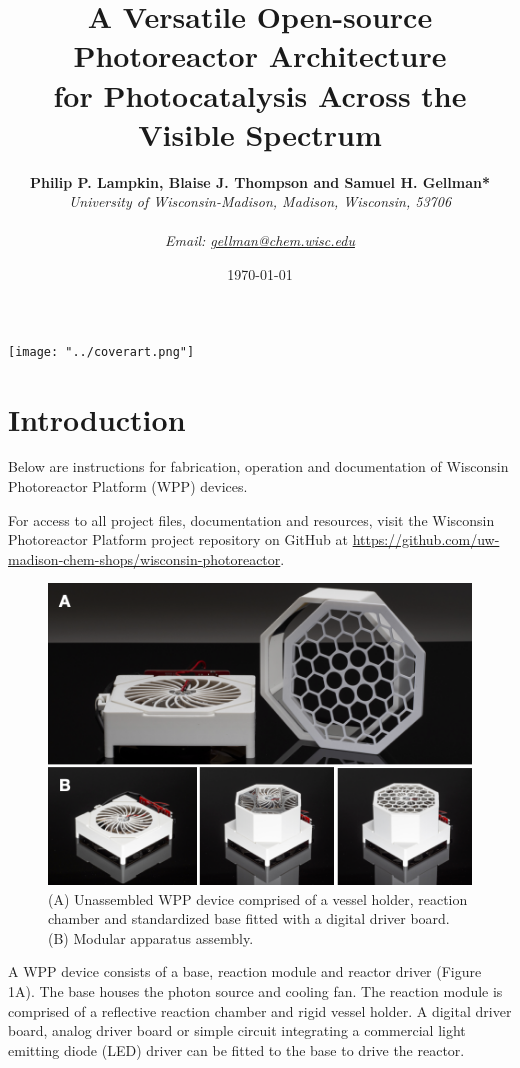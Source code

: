 \documentclass[11pt]{article}
\title{%
	\textbf{A Versatile Open-source Photoreactor Architecture\\ for Photocatalysis Across the Visible Spectrum}}
\author{\textbf{Philip P. Lampkin, Blaise J. Thompson and Samuel H. Gellman*} \\ \textit{University of Wisconsin-Madison, Madison, Wisconsin, 53706} \\ \\ \textit{Email: \href{mailto:gellman@chem.wisc.edu}{gellman@chem.wisc.edu}}}
\date{\today}
\let\stdsection\section
\renewcommand\section{\clearpage\stdsection}
\begin{document}
\maketitle

\texttt{[image: "../coverart.png"]}

\tableofcontents

\section{Introduction}

Below are instructions for fabrication, operation and documentation of Wisconsin Photoreactor Platform (WPP) devices.

For access to all project files, documentation and resources, visit the Wisconsin Photoreactor Platform project repository on GitHub at \href{https://github.com/uw-madison-chem-shops/wisconsin-photoreactor}{https://github.com/uw-madison-chem-shops/wisconsin-photoreactor}.

\begin{figure}[H]
	\includegraphics[width=\textwidth]{"./fig1.png"}
	\caption{(A) Unassembled WPP device comprised of a vessel holder, reaction chamber and standardized base fitted with a digital driver board. (B) Modular apparatus assembly.}
\end{figure}
A WPP device consists of a base, reaction module and reactor driver (Figure 1A).
The base houses the photon source and cooling fan.
The reaction module is comprised of a reflective reaction chamber and rigid vessel holder.
A digital driver board, analog driver board or simple circuit integrating a commercial light emitting diode (LED) driver can be fitted to the base to drive the reactor.
\end{document}
